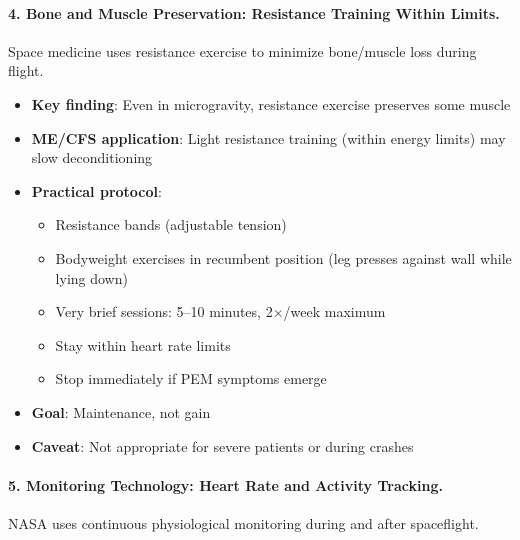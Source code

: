 \paragraph{4. Bone and Muscle Preservation: Resistance Training Within Limits.}
Space medicine uses resistance exercise to minimize bone/muscle loss during flight.

\begin{itemize}
    \item \textbf{Key finding}: Even in microgravity, resistance exercise preserves some muscle
    \item \textbf{ME/CFS application}: Light resistance training (within energy limits) may slow deconditioning
    \item \textbf{Practical protocol}:
    \begin{itemize}
        \item Resistance bands (adjustable tension)
        \item Bodyweight exercises in recumbent position (leg presses against wall while lying down)
        \item Very brief sessions: 5--10 minutes, 2$\times$/week maximum
        \item Stay within heart rate limits
        \item Stop immediately if PEM symptoms emerge
    \end{itemize}
    \item \textbf{Goal}: Maintenance, not gain
    \item \textbf{Caveat}: Not appropriate for severe patients or during crashes
\end{itemize}

\paragraph{5. Monitoring Technology: Heart Rate and Activity Tracking.}
NASA uses continuous physiological monitoring during and after spaceflight.

